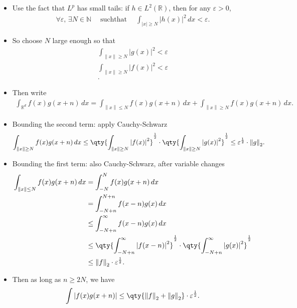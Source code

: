 \begin{solution}

\envlist

\begin{itemize}
\item
  Use the fact that \(L^p\) has small tails: if
  \(h\in L^2({\mathbb{R}})\), then for any \({\varepsilon}> 0\),
  \begin{align*}  
  \forall {\varepsilon},\, \exists N\in {\mathbb{N}}{\quad \operatorname{such that} \quad}\int_{{\left\lvert {x} \right\rvert} \geq {N}} {\left\lvert {h(x)} \right\rvert}^2 \,dx < {\varepsilon}
  .\end{align*}
\item
  So choose \(N\) large enough so that
  \begin{align*}  
  \int_{{\left\lVert {x} \right\rVert} \geq N}{\left\lvert {g(x)} \right\rvert}^2 < {\varepsilon}\\
  \int_{{\left\lVert {x} \right\rVert} \geq N}{\left\lvert {f(x)} \right\rvert}^2 < {\varepsilon}\\
  .\end{align*}
\item
  Then write
  \begin{align*}  
  \int_{{\mathbb{R}}^d} f(x) g(x+n) \,dx = \int_{{\left\lVert {x} \right\rVert} \leq N} f(x)g(x+n)\,dx + \int_{{\left\lVert {x} \right\rVert} \geq N} f(x) g(x+n)\,dx
  .\end{align*}
\item
  Bounding the second term: apply Cauchy-Schwarz
  \begin{align*}  
  \int_{{\left\lVert {x} \right\rVert} \geq N} f(x) g(x+n)\,dx
  \leq 
  \qty{ \int_{{\left\lVert {x} \right\rVert} \geq N} {\left\lvert {f(x)} \right\rvert}^2}^{1\over 2} \cdot 
  \qty{ \int_{{\left\lVert {x} \right\rVert} \geq N} {\left\lvert {g(x)} \right\rvert}^2}^{1\over 2}
  \leq {\varepsilon}^{1\over 2} \cdot {\left\lVert {g} \right\rVert}_2
  .\end{align*}
\item
  Bounding the first term: also Cauchy-Schwarz, after variable changes
  \begin{align*}  
  \int_{{\left\lVert {x} \right\rVert} \leq N} f(x) g(x+n)\,dx 
  &= \int_{-N}^N f(x) g(x+n)\,dx \\
  &= \int_{-N+n}^{N+n} f(x-n) g(x)\,dx \\
  &\leq \int_{-N+n}^{\infty} f(x-n) g(x)\,dx \\
  &\leq \qty{\int_{-N+n}^{\infty} {\left\lvert {f(x-n)} \right\rvert}^2}^{1\over 2}\cdot \qty{\int_{-N+n}^{\infty} {\left\lvert {g(x)} \right\rvert}^2}^{1\over 2} \\
  &\leq {\left\lVert {f} \right\rVert}_2 \cdot {\varepsilon}^{1\over 2}
  .\end{align*}
\item
  Then as long as \(n\geq 2N\), we have
  \begin{align*}  
  \int {\left\lvert {f(x) g(x+n)} \right\rvert} \leq \qty{{\left\lVert {f} \right\rVert}_2 + {\left\lVert {g} \right\rVert}_2} \cdot {\varepsilon}^{1\over 2} 
  .\end{align*}
\end{itemize}


\end{solution}
